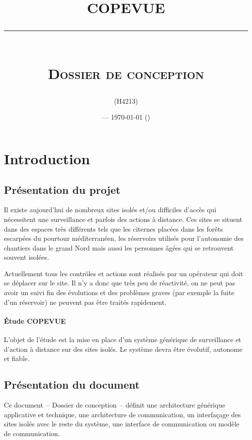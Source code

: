 \documentclass[a4paper, 11pt, final]{article}
\title{\textbf{COPEVUE}\\
\rule{\textwidth}{1pt}{}\\
\Huge{\textsc{Dossier de conception}}}
\author{\docauthor{} (H4213)}
\date{\docname{} --- \today{} (\docstatus{})}
\begin{document}
\maketitle

\tableofcontents

\pagebreak



\section{Introduction}
\subsection{Présentation du projet}
Il existe aujourd'hui de nombreux sites isolés et/ou difficiles
d'accès qui nécessitent une surveillance et parfois des actions à
distance. Ces sites se situent dans des espaces très différents tels
que les citernes placées dans les forêts escarpées du pourtour
méditerranéen, les réservoirs utilisés pour l'autonomie des chantiers
dans le grand Nord mais aussi les personnes âgées qui se retrouvent
souvent isolées.

Actuellement tous les contrôles et actions sont réalisés par un
opérateur qui doit se déplacer sur le site. Il n'y a donc que très peu
de réactivité, on ne peut pas avoir un suivi fin des évolutions et des
problèmes graves (par exemple la fuite d'un réservoir) ne peuvent pas
être traités rapidement.

\paragraph{Étude COPEVUE}
L'objet de l'étude est la mise en place d'un système générique de
surveillance et d'action à distance sur des sites isolés. Le système
devra être évolutif, autonome et fiable.

\subsection{Présentation du document}
Ce document~-- Dossier de conception~-- définit une architecture
générique applicative et technique, une architecture de communication,
un interfaçage des sites isolés avec le reste du système, une
interface de communication ou modèle de communication.
\end{document}
